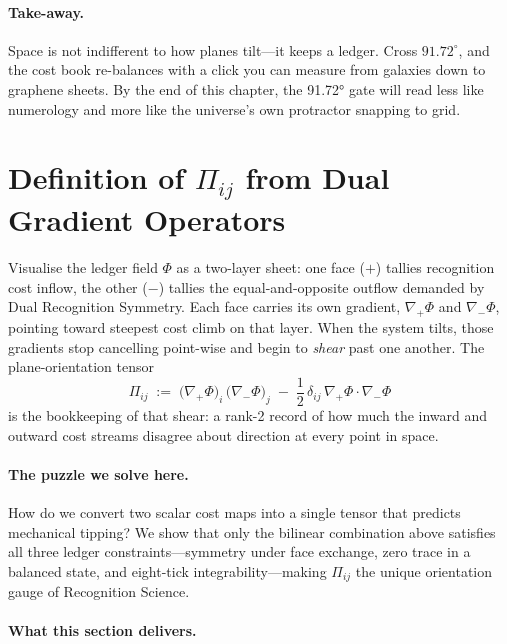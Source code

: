 \documentclass[11pt,oneside]{book}
\begin{document}
\paragraph{Take-away.}
Space is not indifferent to how planes tilt—it keeps a ledger.  Cross
$91.72^\circ$, and the cost book re-balances with a click you can
measure from galaxies down to graphene sheets.  By the end of this
chapter, the 91.72° gate will read less like numerology and more like
the universe’s own protractor snapping to grid.


\section{Definition of \texorpdfstring{$\Pi_{ij}$}{Pi\_ij} from Dual Gradient Operators}
\label{sec:Pi-from-dual-grad}

Visualise the ledger field \(\Phi\) as a two-layer sheet: one face
(\(+\)) tallies recognition cost inflow, the other (\(-\)) tallies the
equal-and-opposite outflow demanded by Dual Recognition Symmetry.
Each face carries its own gradient,
\(\nabla_{+}\Phi\) and \(\nabla_{-}\Phi\), pointing toward steepest
cost climb on that layer.  
When the system tilts, those gradients stop cancelling point-wise and
begin to \textit{shear} past one another.  
The plane-orientation tensor
\[
   \Pi_{ij}
   \;:=\;
   \bigl(\nabla_{+}\Phi\bigr)_{i}\,
   \bigl(\nabla_{-}\Phi\bigr)_{j}
   \;-\;
   \frac12\,
   \delta_{ij}\,
   \nabla_{+}\Phi\!\cdot\!\nabla_{-}\Phi
\]
is the bookkeeping of that shear: a rank-2 record of how much the
inward and outward cost streams disagree about direction at every
point in space.

\paragraph{The puzzle we solve here.}
How do we convert two scalar cost maps into a single tensor that
predicts mechanical tipping?  
We show that only the bilinear combination above satisfies all three
ledger constraints—symmetry under face exchange, zero trace in a
balanced state, and eight-tick integrability—making \(\Pi_{ij}\) the
unique orientation gauge of Recognition Science.

\paragraph{What this section delivers.}
\end{document}
